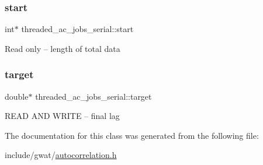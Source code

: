\subsubsection{\texorpdfstring{start}{start}}
{\footnotesize\ttfamily int$\ast$ threaded\+\_\+ac\+\_\+jobs\+\_\+serial\+::start}

Read only -- length of total data \mbox{\label{classthreaded__ac__jobs__serial_a0a870c7ac95ad680d3bc8ca80f1df9f3}} 
\subsubsection{\texorpdfstring{target}{target}}
{\footnotesize\ttfamily double$\ast$ threaded\+\_\+ac\+\_\+jobs\+\_\+serial\+::target}

R\+E\+AD A\+ND W\+R\+I\+TE -- final lag 

The documentation for this class was generated from the following file\+:\begin{DoxyCompactItemize}
\item 
include/gwat/\hyperlink{autocorrelation_8h}{autocorrelation.\+h}\end{DoxyCompactItemize}
